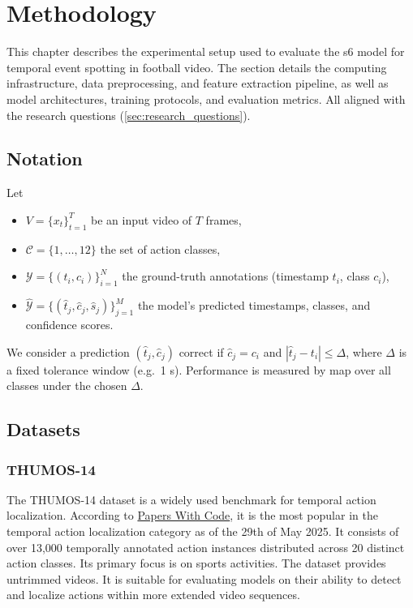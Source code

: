 \chapter{Methodology} 
\label{chap:methodology}
This chapter describes the experimental setup used to evaluate the \acrfull{s6} model for temporal event spotting in football video. The section details the computing infrastructure, data preprocessing, and feature extraction pipeline, as well as model architectures, training protocols, and evaluation metrics. All aligned with the research questions (\autoref{sec:research_questions}).



\section{Notation}
\label{sec:notation}
Let
\begin{itemize}
  \item $V=\{x_t\}_{t=1}^T$ be an input video of $T$ frames,
  \item $\mathcal{C}=\{1,\dots,12\}$ the set of action classes,
  \item $\mathcal{Y}=\{(t_i,c_i)\}_{i=1}^N$ the ground-truth annotations (timestamp $t_i$, class $c_i$),
  \item $\hat{\mathcal{Y}}=\{(\hat t_j,\hat c_j,\hat s_j)\}_{j=1}^M$ the model's predicted timestamps, classes, and confidence scores.
\end{itemize}
We consider a prediction $(\hat t_j,\hat c_j)$ correct if $\hat c_j=c_i$ and $|\hat t_j - t_i|\le\Delta$, where $\Delta$ is a fixed tolerance window (e.g.\ 1 s). Performance is measured by \acrfull{map} over all classes under the chosen $\Delta$.


\section{Datasets}
\label{sec:method_datasets}

\subsection{THUMOS-14}
\label{ssec:method_thumos14}
The THUMOS-14 dataset \cite{dataset:thumos} is a widely used benchmark for temporal action localization. According to \hyperlink{https://paperswithcode.com/dataset/thumos14-1}{Papers With Code}, it is the most popular in the temporal action localization category as of the 29th of May 2025. It consists of over 13,000 temporally annotated action instances distributed across 20 distinct action classes. Its primary focus is on sports activities. The dataset provides untrimmed videos. It is suitable for evaluating models on their ability to detect and localize actions within more extended video sequences. 

